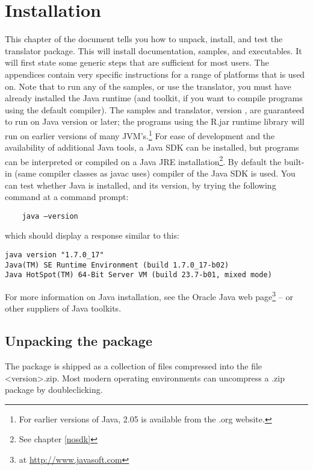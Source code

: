 \chapter{Installation}
This chapter of the document tells you how to unpack, install, and test the \nr{} translator package. This will install documentation, samples, and executables. It will first state some generic steps that are sufficient for most users. The appendices contain very specific instructions for a range of platforms that \nr{} is used on. 
Note that to run any of the samples, or use the \nr{} translator, you must have already installed the Java runtime (and toolkit, if you want to compile \nr{} programs using the default compiler). 
The \nr{} samples and translator, version , are
guaranteed to run on Java version \minimalJVMversion{} or later; the programs using the
\nr{}R.jar runtime library will run on earlier versions of many JVM's.\footnote{For earlier versions of Java,
  \nr{} 2.05 is available from the \nr{}.org website.} For ease
of development and the availability of additional Java tools, a Java
SDK can be installed, but \nr{}
programs can be interpreted or compiled on a Java JRE
installation\footnote{See chapter \ref{nosdk}}. By
default the built-in (same compiler classes as javac uses) compiler of the Java SDK is used. You can test whether Java is installed, and its version, by trying the following command at a command prompt:
\begin{verbatim} 
    java –version
\end{verbatim}
which should display a response similar to this:
\begin{verbatim} 
java version "1.7.0_17"
Java(TM) SE Runtime Environment (build 1.7.0_17-b02)
Java HotSpot(TM) 64-Bit Server VM (build 23.7-b01, mixed mode)
\end{verbatim}
For more information on Java installation, see the Oracle Java web page\footnote{at \url{http://www.javasoft.com}} – or other suppliers of Java toolkits.

\section{Unpacking the \nr{} package}
The \nr{} package is shipped as a collection of files compressed into the file \nr{}<version>.zip. 
Most modern operating environments can uncompress a .zip package by doubleclicking.
